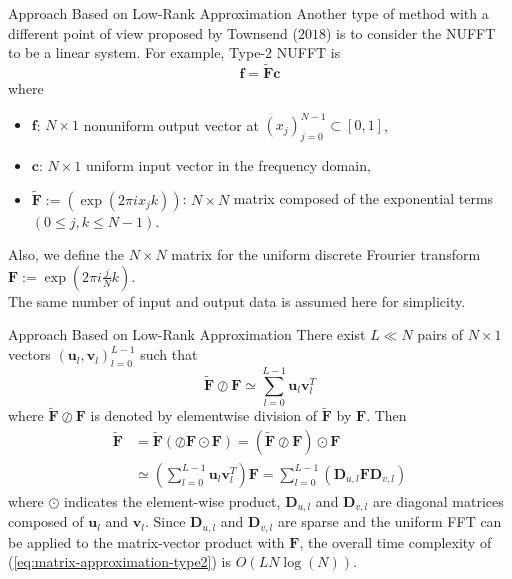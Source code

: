 \documentclass{beamer}
\begin{document}
\begin{frame}{Approach Based on Low-Rank Approximation}
  Another type of method with a different point of view proposed by Townsend ($2018$)
  \cite{SISC-2018-Townsend} is to consider the NUFFT to be a linear system. 
  For example, Type-$2$ NUFFT is
  \begin{equation}
    \bm{f} = \tilde{\bm{F}}\bm{c}
    \label{eq:matrix-vector-product-nufft-type-2}
  \end{equation}
  where
  \begin{itemize}
    \item $\bm{f}$: $N \times 1$ nonuniform output vector at $(x_j)_{j=0}^{N-1} \subset [0, 1]$,
    \item $\bm{c}$: $N \times 1$ uniform input vector in the frequency domain,
    \item $\tilde{\bm{F}} := \left(\exp(2\pi i x_{j}k)\right)$: $N \times N$ matrix composed of the exponential terms
    $(0 \le j, k \le N-1)$.
  \end{itemize}
  Also, we define the $N \times N$ matrix for the uniform discrete Frourier transform
  $\bm{F} := \exp(2\pi i \frac{j}{N}k)$.\\
  The same number of input and output data is assumed here for simplicity.
\end{frame}

\begin{frame}{Approach Based on Low-Rank Approximation}
  There exist $L \ll N$ pairs of $N \times 1$
  vectors $(\bm{u}_l, \bm{v}_l)_{l=0}^{L-1}$ such that
  \begin{equation}
    \bm{\tilde{F}}\oslash\bm{F} \simeq
    \sum_{l=0}^{L-1}\bm{u}_{l}\bm{v}_{l}^{T}
  \end{equation}
  where $\tilde{\bm{F}}\oslash\bm{F}$ is denoted by elementwise division of $\tilde{\bm{F}}$ by $\bm{F}$. Then
  \begin{align}
       \tilde{\bm{F}}
    &= \tilde{\bm{F}}\left(\oslash\bm{F}\odot\bm{F}\right)
     = \left(\tilde{\bm{F}}\oslash\bm{F}\right)\odot\bm{F} \\
    &\simeq \left(\sum_{l=0}^{L-1}\bm{u}_{l}\bm{v}_{l}^{T}\right)\bm{F}
     = \sum_{l=0}^{L-1}\left(\bm{D}_{u,l}\bm{F}\bm{D}_{v,l}\right)
    \label{eq:matrix-approximation-type2}
  \end{align}
  where $\odot$ indicates the element-wise product,
  $\bm{D}_{u,l}$ and $\bm{D}_{v,l}$ are diagonal matrices composed of $\bm{u}_{l}$ and $\bm{v}_{l}$.
  Since $\bm{D}_{u,l}$ and $\bm{D}_{v,l}$ are sparse and the uniform FFT can be applied to the matrix-vector product with $\bm{F}$, the overall time complexity of (\ref{eq:matrix-approximation-type2})
  is $O(L N \log(N))$.
\end{frame}
\end{document}
